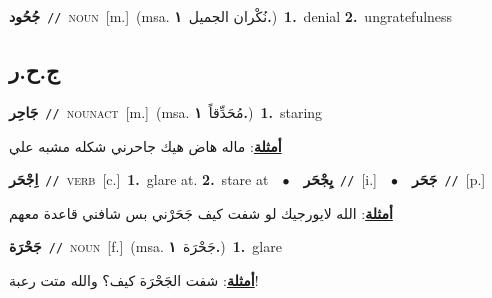 \documentclass[10pt,a4paper,twoside]{article} %
\begin{document}
\begin{multicols}{2}
{{{{{{{{\setlength\topsep{0pt}\textbf{\foreignlanguage{arabic}{جُحُود}}\ {\color{gray}\texttt{//}\color{black}}\ \textsc{noun}\ [m.]\ \color{gray}(msa. \foreignlanguage{arabic}{نُكْران الجميل}~\foreignlanguage{arabic}{\textbf{١.}})\color{black}\ \textbf{1.}~denial  \textbf{2.}~ungratefulness\ 

\vspace{-3mm}
\subsection*{\color{blue}\foreignlanguage{arabic}{ج.ح.ر}\color{blue}{}} 

{\setlength\topsep{0pt}\textbf{\foreignlanguage{arabic}{جَاحِر}}\ {\color{gray}\texttt{//}\color{black}}\ \textsc{noun\textunderscore act}\ [m.]\ \color{gray}(msa. \foreignlanguage{arabic}{مُحَدِّقاً}~\foreignlanguage{arabic}{\textbf{١.}})\color{black}\ \textbf{1.}~staring\  \begin{flushright}\color{gray}\foreignlanguage{arabic}{\textbf{\underline{\foreignlanguage{arabic}{أمثلة}}}: ماله هاض هيك جاحرني شكله مشبه علي}\end{flushright}\color{black}} \vspace{2mm}

{\setlength\topsep{0pt}\textbf{\foreignlanguage{arabic}{اِجْحَر}}\ {\color{gray}\texttt{//}\color{black}}\ \textsc{verb}\ [c.]\ \textbf{1.}~glare at.  \textbf{2.}~stare at\ \ $\bullet$\ \ \setlength\topsep{0pt}\textbf{\foreignlanguage{arabic}{يِجْحَر}}\ {\color{gray}\texttt{//}\color{black}}\ [i.]\ \ $\bullet$\ \ \setlength\topsep{0pt}\textbf{\foreignlanguage{arabic}{جَحَر}}\ {\color{gray}\texttt{//}\color{black}}\ [p.]\  \begin{flushright}\color{gray}\foreignlanguage{arabic}{\textbf{\underline{\foreignlanguage{arabic}{أمثلة}}}: الله لايورجيك لو شفت كيف جَحَرْني بس شافني قاعدة معهم}\end{flushright}\color{black}} \vspace{2mm}

{\setlength\topsep{0pt}\textbf{\foreignlanguage{arabic}{جَحْرَة}}\ {\color{gray}\texttt{//}\color{black}}\ \textsc{noun}\ [f.]\ \color{gray}(msa. \foreignlanguage{arabic}{جَحْرَة}~\foreignlanguage{arabic}{\textbf{١.}})\color{black}\ \textbf{1.}~glare\  \begin{flushright}\color{gray}\foreignlanguage{arabic}{\textbf{\underline{\foreignlanguage{arabic}{أمثلة}}}: شفت الجَحْرَة كيف؟ والله متت رعبة!}\end{flushright}\color{black}} \vspace{2mm}

}}}}}}}}
\end{multicols}
\end{document}
